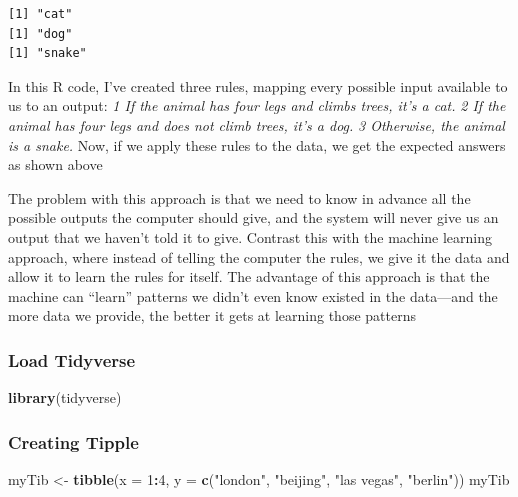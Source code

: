 \documentclass[
]{article}
\newenvironment{Shaded}{\begin{snugshade}}{\end{snugshade}}
\newcommand{\AttributeTok}[1]{\textcolor[rgb]{0.13,0.29,0.53}{#1}}
\newcommand{\DecValTok}[1]{\textcolor[rgb]{0.00,0.00,0.81}{#1}}
\newcommand{\FunctionTok}[1]{\textcolor[rgb]{0.13,0.29,0.53}{\textbf{#1}}}
\newcommand{\NormalTok}[1]{#1}
\newcommand{\OtherTok}[1]{\textcolor[rgb]{0.56,0.35,0.01}{#1}}
\newcommand{\SpecialCharTok}[1]{\textcolor[rgb]{0.81,0.36,0.00}{\textbf{#1}}}
\newcommand{\StringTok}[1]{\textcolor[rgb]{0.31,0.60,0.02}{#1}}
\begin{document}
\begin{verbatim}
[1] "cat"
[1] "dog"
[1] "snake"
\end{verbatim}

In this R code, I've created three rules, mapping every possible input
available to us to an output: \emph{1 If the animal has four legs and
climbs trees, it's a cat.} \emph{2 If the animal has four legs and does
not climb trees, it's a dog.} \emph{3 Otherwise, the animal is a snake.}
Now, if we apply these rules to the data, we get the expected answers as
shown above

The problem with this approach is that we need to know in advance all
the possible outputs the computer should give, and the system will never
give us an output that we haven't told it to give. Contrast this with
the machine learning approach, where instead of telling the computer the
rules, we give it the data and allow it to learn the rules for itself.
The advantage of this approach is that the machine can ``learn''
patterns we didn't even know existed in the data---and the more data we
provide, the better it gets at learning those patterns

\subsubsection{Load Tidyverse}\label{load-tidyverse}

\begin{Shaded}
\begin{Highlighting}[]
\FunctionTok{library}\NormalTok{(tidyverse)}
\end{Highlighting}
\end{Shaded}

\subsubsection{Creating Tipple}\label{creating-tipple}

\begin{Shaded}
\begin{Highlighting}[]
\NormalTok{myTib }\OtherTok{\textless{}{-}} \FunctionTok{tibble}\NormalTok{(}\AttributeTok{x =} \DecValTok{1}\SpecialCharTok{:}\DecValTok{4}\NormalTok{, }
                \AttributeTok{y =} \FunctionTok{c}\NormalTok{(}\StringTok{"london"}\NormalTok{, }\StringTok{"beijing"}\NormalTok{, }\StringTok{"las vegas"}\NormalTok{, }\StringTok{"berlin"}\NormalTok{)) }
\NormalTok{myTib}
\end{Highlighting}
\end{Shaded}
\end{document}
